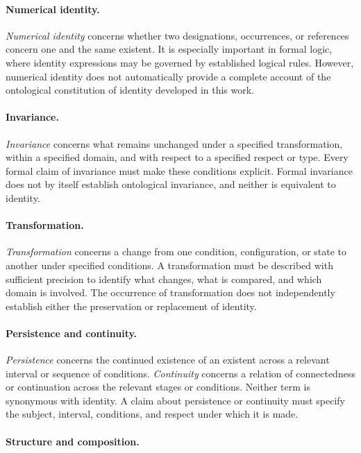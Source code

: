 \paragraph{Numerical identity.}

\emph{Numerical identity} concerns whether two
designations, occurrences, or references concern
one and the same existent. It is especially
important in formal logic, where identity
expressions may be governed by established
logical rules. However, numerical identity
does not automatically provide a complete
account of the ontological constitution of
identity developed in this work.

\paragraph{Invariance.}

\emph{Invariance} concerns what remains unchanged
under a specified transformation, within a
specified domain, and with respect to a specified
respect or type. Every formal claim of invariance
must make these conditions explicit. Formal
invariance does not by itself establish ontological
invariance, and neither is equivalent to identity.

\paragraph{Transformation.}

\emph{Transformation} concerns a change from one
condition, configuration, or state to another
under specified conditions. A transformation
must be described with sufficient precision to
identify what changes, what is compared, and
which domain is involved. The occurrence of
transformation does not independently establish
either the preservation or replacement of identity.

\paragraph{Persistence and continuity.}

\emph{Persistence} concerns the continued existence
of an existent across a relevant interval or
sequence of conditions. \emph{Continuity} concerns
a relation of connectedness or continuation
across the relevant stages or conditions.
Neither term is synonymous with identity.
A claim about persistence or continuity must
specify the subject, interval, conditions, and
respect under which it is made.

\paragraph{Structure and composition.}


